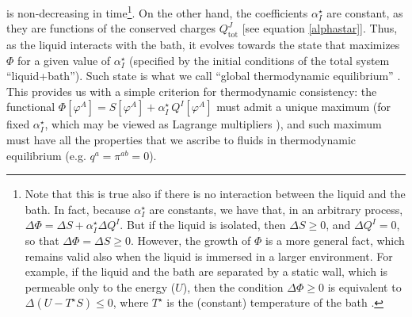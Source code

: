 \documentclass[a4paper, amsfonts, amssymb, amsmath, reprint, showkeys, nofootinbib, twoside, onecolumn, notitlepage]{revtex4-1}
\theoremstyle{definition}
\theoremstyle{theorem}
\begin{document}
is non-decreasing in time\footnote{Note that this is true also if there is no interaction between the liquid and the bath. In fact, because $\alpha^\star_I$ are constants, we have that, in an arbitrary process, $\Delta \Phi= \Delta S +\alpha^\star_I \Delta Q^I$. But if the liquid is isolated, then $\Delta S \geq 0$, and $\Delta Q^I=0$, so that $\Delta \Phi=\Delta S \geq 0$. However, the growth of $\Phi$ is a more general fact, which remains valid also when the liquid is immersed in a larger environment. For example, if the liquid and the bath are separated by a static wall, which is permeable only to the energy ($U$), then the condition $\Delta \Phi \geq 0$ is equivalent to $\Delta (U -T^\star S) \leq 0$, where $T^\star$ is the (constant) temperature of the bath \cite{landau5}.}. On the other hand, the coefficients $\alpha^\star_I$ are constant, as they are functions of the conserved charges $Q^J_{\text{tot}}$ [see equation \eqref{alphastar}].
Thus, as the liquid interacts with the bath, it evolves towards the state that maximizes $\Phi$ for a given value of $\alpha^\star_I$ (specified by the initial conditions of the total system ``liquid+bath''). Such state is what we call ``global thermodynamic equilibrium'' \cite{landau5,Stuekelberg1962,Israel_2009_inbook}. This provides us with a simple criterion for thermodynamic consistency: the functional $\Phi[\varphi^A]= S[\varphi^A] + \alpha^\star_I \, Q^I[\varphi^A] $ must admit a unique maximum (for fixed $\alpha^\star_I$, which may be viewed as Lagrange multipliers \cite{GavassinoGibbs2021}), and such maximum must have all the properties that we ascribe to fluids in thermodynamic equilibrium (e.g. $q^a=\pi^{ab}=0$).
\end{document}
